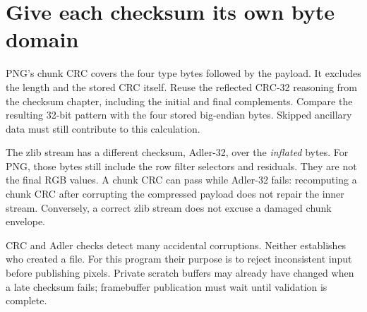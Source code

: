 \section{Give each checksum its own byte domain}
PNG's chunk CRC covers the four type bytes followed by the payload. It excludes the
length and the stored CRC itself. Reuse the reflected CRC-32 reasoning from the
checksum chapter, including the initial and final complements. Compare the resulting
32-bit pattern with the four stored big-endian bytes. Skipped ancillary data must
still contribute to this calculation.

The zlib stream has a different checksum, Adler-32, over the \emph{inflated} bytes.
For PNG, those bytes still include the row filter selectors and residuals. They are
not the final RGB values. A chunk CRC can pass while Adler-32 fails: recomputing a
chunk CRC after corrupting the compressed payload does not repair the inner stream.
Conversely, a correct zlib stream does not excuse a damaged chunk envelope.

CRC and Adler checks detect many accidental corruptions. Neither establishes who
created a file. For this program their purpose is to reject inconsistent input before
publishing pixels. Private scratch buffers may already have changed when a late
checksum fails; framebuffer publication must wait until validation is complete.
